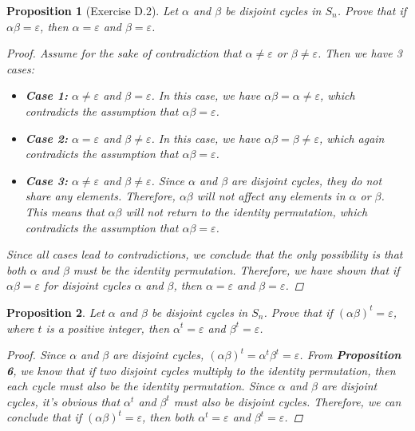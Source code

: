 \documentclass[12pt]{article}
\newtheorem{proposition}{Proposition}
\begin{document}
\begin{proposition}[Exercise D.2]
  Let $\alpha$ and $\beta$ be disjoint cycles in $S_n$.
  Prove that if $\alpha\beta = \varepsilon$, then $\alpha = \varepsilon$ and $\beta = \varepsilon$.
  \begin{proof}
    Assume for the sake of contradiction that $\alpha \neq \varepsilon$ or $\beta \neq \varepsilon$.
    Then we have 3 cases:
    \begin{itemize}
      \item \textbf{Case 1:} $\alpha \neq \varepsilon$ and $\beta = \varepsilon$.
            In this case, we have $\alpha\beta = \alpha \neq \varepsilon$, which contradicts the assumption that $\alpha\beta = \varepsilon$.
      \item \textbf{Case 2:} $\alpha = \varepsilon$ and $\beta \neq \varepsilon$.
            In this case, we have $\alpha\beta = \beta \neq \varepsilon$, which again contradicts the assumption that $\alpha\beta = \varepsilon$.
      \item \textbf{Case 3:} $\alpha \neq \varepsilon$ and $\beta \neq \varepsilon$.
            Since $\alpha$ and $\beta$ are disjoint cycles, they do not share any elements.
            Therefore, $\alpha\beta$ will not affect any elements in $\alpha$ or $\beta$.
            This means that $\alpha\beta$ will not return to the identity permutation,
            which contradicts the assumption that $\alpha\beta = \varepsilon$.
    \end{itemize}
    Since all cases lead to contradictions, we conclude that the only possibility is that both $\alpha$ and $\beta$ must be the identity permutation.
    Therefore, we have shown that if $\alpha\beta = \varepsilon$ for disjoint cycles $\alpha$ and $\beta$, then $\alpha = \varepsilon$ and $\beta = \varepsilon$.
  \end{proof}
\end{proposition}


\begin{proposition}
  Let $\alpha$ and $\beta$ be disjoint cycles in $S_n$.
  Prove that if $(\alpha\beta)^t = \varepsilon$, where $t$ is a positive integer,
  then $\alpha^t = \varepsilon$ and $\beta^t = \varepsilon$.
  \begin{proof}
    Since $\alpha$ and $\beta$ are disjoint cycles, $(\alpha\beta)^t = \alpha^t \beta^t = \varepsilon$.
    From \textbf{Proposition 6}, we know that if two disjoint cycles multiply to the identity permutation,
    then each cycle must also be the identity permutation.
    Since $\alpha$ and $\beta$ are disjoint cycles, it's obvious that $\alpha^t$ and $\beta^t$ must also be disjoint cycles.
    Therefore, we can conclude that if $(\alpha\beta)^t = \varepsilon$, then both $\alpha^t = \varepsilon$ and $\beta^t = \varepsilon$.
  \end{proof}
\end{proposition}


\end{document}
